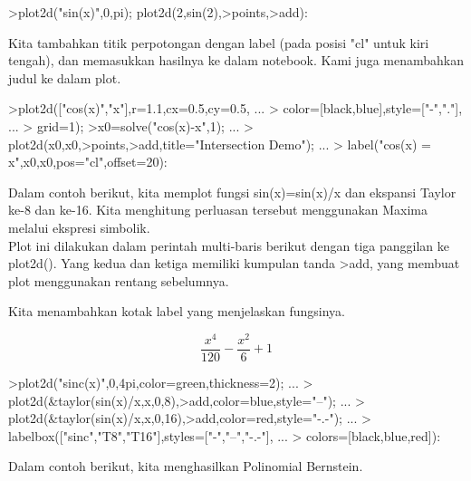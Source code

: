 \documentclass{article}
\begin{document}
\begin{eulernotebook}
\begin{eulercomment}
\begin{eulercomment}
\begin{eulercomment}
\begin{eulercomment}
\begin{eulercomment}
\end{eulercomment}
\begin{eulerprompt}
>plot2d("sin(x)",0,pi); plot2d(2,sin(2),>points,>add):
\end{eulerprompt}
\begin{eulercomment}
Kita tambahkan titik perpotongan dengan label (pada posisi "cl" untuk
kiri tengah), dan memasukkan hasilnya ke dalam notebook. Kami juga
menambahkan judul ke dalam plot.
\end{eulercomment}
\begin{eulerprompt}
>plot2d(["cos(x)","x"],r=1.1,cx=0.5,cy=0.5, ...
>  color=[black,blue],style=["-","."], ...
>  grid=1);
>x0=solve("cos(x)-x",1);  ...
>  plot2d(x0,x0,>points,>add,title="Intersection Demo");  ...
>  label("cos(x) = x",x0,x0,pos="cl",offset=20):
\end{eulerprompt}
\begin{eulercomment}
Dalam contoh berikut, kita memplot fungsi sin(x)=sin(x)/x dan ekspansi
Taylor ke-8 dan ke-16. Kita menghitung perluasan tersebut menggunakan
Maxima melalui ekspresi simbolik.\\
Plot ini dilakukan dalam perintah multi-baris berikut dengan tiga
panggilan ke plot2d(). Yang kedua dan ketiga memiliki kumpulan tanda
\textgreater{}add, yang membuat plot menggunakan rentang sebelumnya.

Kita menambahkan kotak label yang menjelaskan fungsinya.
\end{eulercomment}
\begin{eulerformula}
\[
\frac{x^4}{120}-\frac{x^2}{6}+1
\]
\end{eulerformula}
\begin{eulerprompt}
>plot2d("sinc(x)",0,4pi,color=green,thickness=2); ...
>  plot2d(&taylor(sin(x)/x,x,0,8),>add,color=blue,style="--"); ...
>  plot2d(&taylor(sin(x)/x,x,0,16),>add,color=red,style="-.-"); ...
>  labelbox(["sinc","T8","T16"],styles=["-","--","-.-"], ...
>    colors=[black,blue,red]):
\end{eulerprompt}
\begin{eulercomment}
Dalam contoh berikut, kita menghasilkan Polinomial Bernstein.


\end{eulercomment}
\end{eulercomment}
\end{eulercomment}
\end{eulercomment}
\end{eulercomment}
\end{eulernotebook}
\end{document}
